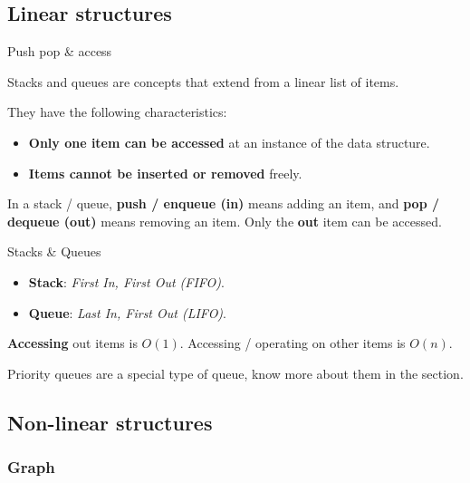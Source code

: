 \subsection{Linear structures}
\label{subsec:linear-structures}

\begin{definition}
    {Push pop \& access}

    Stacks and queues are concepts that extend from a linear list of items.

    They have the following characteristics:
    \begin{itemize}
        \item \textbf{Only one item can be accessed} at an instance of the data structure.
        \item \textbf{Items cannot be inserted or removed} freely.
    \end{itemize}

    In a stack / queue, \textbf{push / enqueue (in)} means adding an item, and \textbf{pop / dequeue (out)} means removing an item. Only the \textbf{out} item can be accessed.
\end{definition}

\begin{definition}
    {Stacks \& Queues}
    \begin{itemize}
        \item \textbf{Stack}: \textit{First In, First Out (FIFO)}.
        \item \textbf{Queue}: \textit{Last In, First Out (LIFO)}.
    \end{itemize}
    \textbf{Accessing} out items is $O(1)$. Accessing / operating on other items is $O(n)$.
\end{definition}

Priority queues are a special type of queue, know more about them in the  section.

\subsection{Non-linear structures}
\label{subsec:nonlinear-structures}

\subsubsection{Graph}

